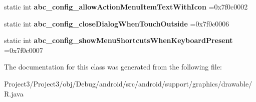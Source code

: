\begin{DoxyCompactItemize}
static int {\bfseries abc\+\_\+config\+\_\+allow\+Action\+Menu\+Item\+Text\+With\+Icon} =0x7f0c0002
\item 
\mbox{\label{classandroid_1_1support_1_1graphics_1_1drawable_1_1R_1_1bool_a6988e7abb37510e52effeae67e0d945b}} 
static int {\bfseries abc\+\_\+config\+\_\+close\+Dialog\+When\+Touch\+Outside} =0x7f0c0006
\item 
\mbox{\label{classandroid_1_1support_1_1graphics_1_1drawable_1_1R_1_1bool_a1db9984f658e7716c6c7af63d45ae152}} 
static int {\bfseries abc\+\_\+config\+\_\+show\+Menu\+Shortcuts\+When\+Keyboard\+Present} =0x7f0c0007
\end{DoxyCompactItemize}


The documentation for this class was generated from the following file\+:\begin{DoxyCompactItemize}
\item 
Project3/\+Project3/obj/\+Debug/android/src/android/support/graphics/drawable/R.\+java\end{DoxyCompactItemize}
